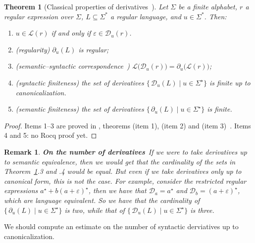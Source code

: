 \documentclass{article}
\newtheorem{theorem}{Theorem}[section]
\newtheorem{remark}{Remark}[section]
\begin{document}
\begin{theorem}[Classical properties of derivatives~\cite{B64,Thiemann2016}]\label{the:derivative}
\label{the:language-derivative-regular}\label{the:two-derivative-mapping}\label{the:derivative-set-is-finite}
Let $\Sigma$ be a finite alphabet, $r$ a regular expression over $\Sigma$,
$L\subseteq\Sigma^*$ a regular language, and $u\in\Sigma^*$. Then:
\begin{enumerate}
\item $u\in \mathcal L(r)$ if and only if $\varepsilon \in \mathcal{D}_{u}(r)$.
  \item (regularity) $\partial_u(L)$ is regular;
  \item (semantic--syntactic correspondence~\cite{B64,Thiemann2016})
        $\mathcal{L}\bigl(\mathcal{D}_{u}(r)\bigr)=\partial_{u}\bigl(\mathcal{L}(r)\bigr)$;
\item (syntactic finiteness) the set of derivatives $\bigl\{\, \mathcal D_{u}(L) \mid u \in \Sigma^\star \bigr\}$ is
        finite up to canonicalization.
  \item (semantic finiteness) the set of derivatives $\bigl\{\, \partial_{u}(L) \mid u \in \Sigma^\star \bigr\}$ is
        finite.
\end{enumerate}
\end{theorem}
\begin{proof}
\begin{sloppypar}\raggedright
Items 1--3 are proved in , theorems
 (item 1),  (item 2) and
 (item 3)~\cite{OurRocqRepo}.
{\color{red} Items 4 and 5: no Rocq proof yet.}
\end{sloppypar}
\end{proof}
{\begin{remark}\em  {\bf On the number of derivatives}\ If we were to take derivatives up to semantic equivalence, then we would get that the cardinality of the sets in Theorem~\ref{the:derivative}.3 and .4 would be equal. But even if we take derivatives only up to canonical form, this is not the case. For example, consider the restricted regular expressions $a^\star
+b(a+\varepsilon)^\star$, then we have that $\mathcal D_a=a^\star$ and $\mathcal D_b=(a+\varepsilon)^\star$, which are language equivalent. So we have that the cardinality of $\bigl\{\, \partial_{u}(L) \mid u \in \Sigma^\star \bigr\}$ is two, while that of $\bigl\{\, \mathcal D_{u}(L) \mid u \in \Sigma^\star \bigr\}$ is three.\end{remark}}
{\color{red} We should compute an estimate on the number of syntactic derviatives up to canonicalization.}
\end{document}
